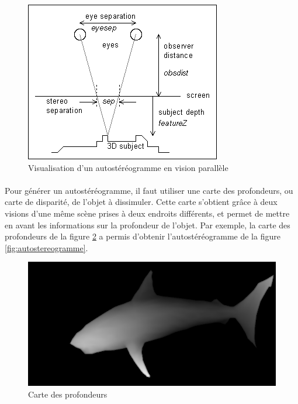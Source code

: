\begin{figure}[h]
  \centering
  \includegraphics[scale=0.5]{./ppe_autostereogramme.png}
  \caption{Visualisation d’un autostéréogramme en vision parallèle \protect \footnotemark }
  \label{fig:ppe_autostereogramme}
\end{figure}


\paragraph{}
	Pour générer un autostéréogramme, il faut utiliser une carte des profondeurs, ou carte de disparité, de l’objet à dissimuler. Cette carte s’obtient grâce à deux visions d’une même scène prises à deux endroits différents, et permet de mettre en avant les informations sur la profondeur de l’objet. Par exemple, la carte des profondeurs de la figure \ref{fig:carteProfondeur} a permis d’obtenir l’autostéréogramme de la figure \ref{fig:autostereogramme}.

\begin{figure}[h]
		\centering
		\includegraphics[scale=0.2]{carteProfondeur.png}
		\caption{\label{fig:carteProfondeur} Carte des profondeurs \protect \footnotemark }
\end{figure}

